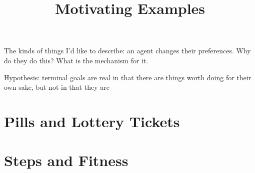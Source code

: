 \documentclass{article}
\title{Motivating Examples}
\begin{document}
	The kinds of things I'd like to describe: an agent changes their preferences. Why do they do this? What is the mechanism for it. 
	
	Hypothesis: terminal goals are real in that there are things worth doing for their own sake, but not in that they are
	
	\section{Pills and Lottery Tickets}
	\section{Steps and Fitness}
	\section{}
	
\end{document}
